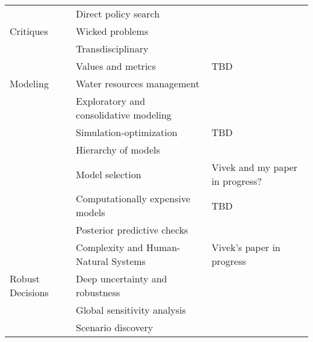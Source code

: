 \documentclass[nobib]{tufte-handout}
\begin{document}
\begin{fullwidth}
\begin{tabular}{R{1in} L{3in} L{2.5in}}
		                 & Direct policy search                          & \citet{quinn_dps:2017}                                          \\
		Critiques        & Wicked problems                               & \citet{rittel:1973}                                             \\
		                 & Transdisciplinary                             & \citet{mobjork_transdisciplinarity:2010}                        \\
		                 & Values and metrics                            & TBD                                                             \\
		Modeling         & Water resources management                    & \citet{Brown:2015bl}                                            \\
		                 & Exploratory and consolidative modeling        & \citet{bankes:1993}                                             \\
		                 & Simulation-optimization                       & TBD                                                             \\
		                 & Hierarchy of models                           & \citet{Held:2005cj}                                             \\
		                 & Model selection                               & Vivek and my paper in progress?                                 \\
		                 & Computationally expensive models              & TBD                                                             \\
		                 & Posterior predictive checks                   & \citet{betancourt:2018b}                                        \\
		                 & Complexity and Human-Natural Systems          & Vivek's paper in progress                                       \\
		Robust Decisions & Deep uncertainty and robustness               & \citet{Walker:2013gi}                                           \\
		                 & Global sensitivity analysis                   & \citet{pianosi_sensitivity:2016}                                \\
		                 & Scenario discovery                            & \citet{kasprzyk:2013}                                           \\

\end{tabular}
\end{fullwidth}
\end{document}
